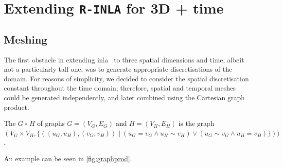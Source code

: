 \documentclass[british]{scrreprt}
\newcommand{\graphprod}{\mathbin{\square}}
\newcommand{\adj}{\mathbin{\sim}}
\begin{document}
\chapter{Extending \texorpdfstring{\texttt{R-INLA}}{R-INLA} for 3D + time}
\label{ch:main}

\section{Meshing}
\label{sec:meshing}
The first obstacle in extending \gls{inla}~\cite{RueApproximateBayesianinference2009} to three spatial dimensions and time, albeit not a particularly tall one, was to generate appropriate discretisations of the domain. For reasons of simplicity, we decided to consider the spatial discretisation constant throughout the time domain; therefore, spatial and temporal meshes could be generated independently, and later combined using the Cartesian graph product.

\begin{Definition}
    \label{def:graph-product}
    The \Definitionname{} \( G \graphprod H \) of graphs \( G = (V_{G}, E_{G}) \) and \( H = (V_{H}, E_{H}) \) is the graph \( (V_{G} \times V_{H}, \{ ((u_{G}, u_{H}), (v_{G}, v_{H})) \mid (u_{G} = v_{G} \wedge u_{H} \adj v_{H}) \vee (u_{G} \adj v_{G} \wedge u_{H} = v_{H}) \} ) ) \).

   An example can be seen in \cref{fig:graphprod}.
\end{Definition}
\end{document}
